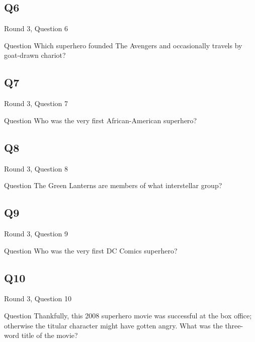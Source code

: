 \documentclass[11pt]{beamer}
\begin{document}
\subsection*{Q6}
\begin{frame}[t]{Round 3, Question 6}
\begin{block}{Question}
Which superhero founded The Avengers and occasionally travels by goat-drawn chariot?
\end{block}
\end{frame}
\subsection*{Q7}
\begin{frame}[t]{Round 3, Question 7}
\begin{block}{Question}
Who was the very first African-American superhero?
\end{block}
\end{frame}
\subsection*{Q8}
\begin{frame}[t]{Round 3, Question 8}
\begin{block}{Question}
The Green Lanterns are members of what interstellar group?
\end{block}
\end{frame}
\subsection*{Q9}
\begin{frame}[t]{Round 3, Question 9}
\begin{block}{Question}
Who was the very first DC Comics superhero?
\end{block}
\end{frame}
\subsection*{Q10}
\begin{frame}[t]{Round 3, Question 10}
\begin{block}{Question}
Thankfully, this 2008 superhero movie was successful at the box office; otherwise the titular character might have gotten angry.  What was the three-word title of the movie?
\end{block}
\end{frame}
\end{document}

